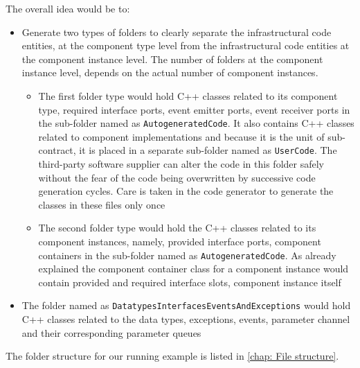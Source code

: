 The overall idea would be to:
\begin{itemize}
\item Generate two types of folders to clearly separate the infrastructural code entities, at the component type level from the infrastructural code entities at the component instance level. The number of folders at the component instance level, depends on the actual number of component instances.   
\begin{itemize}
\item The first folder type would hold C++ classes related to its component type, required interface ports, event emitter ports, event receiver ports in the sub-folder named as \texttt{AutogeneratedCode}. It also contains C++ classes related to component implementations and because it is the unit of sub-contract, it is placed in a separate sub-folder named as \texttt{UserCode}. The third-party software supplier can alter the code in this folder safely without the fear of the code being overwritten by successive code generation cycles. Care is taken in the code generator to generate the classes in these files only once  
\item The second folder type would hold the C++ classes related to its component instances, namely, provided interface ports, component containers in the sub-folder named as \texttt{AutogeneratedCode}. As already explained the component container class for a component instance would contain provided and required interface slots, component instance itself   
\end{itemize} 
\item The folder named as \texttt{Datatypes\allowbreak Interfaces\allowbreak EventsAnd\allowbreak Exceptions} would hold C++ classes related to the data types, exceptions, events, parameter channel and their corresponding parameter queues 
\end{itemize}

The folder structure for our running example is listed in \cref{chap: File structure}.
  



 

   

 


 
   



 


 
